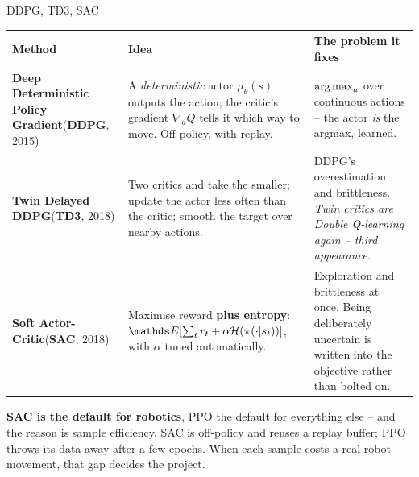 \documentclass[aspectratio=169]{beamer}
\begin{document}
\begin{frame}{DDPG, TD3, SAC}
  \footnotesize
  \begin{center}
  \begin{tabular}{p{2.1cm} p{5.0cm} p{5.4cm}}
    \toprule
    \textbf{Method} & \textbf{Idea} & \textbf{The problem it fixes} \\
    \midrule
    \textbf{Deep Deterministic Policy Gradient}\newline (\textbf{DDPG}, 2015) &
      A \emph{deterministic} actor $\mu_\theta(s)$ outputs the action; the critic's gradient
      $\nabla_a Q$ tells it which way to move. Off-policy, with replay. &
      $\mathop{\mathrm{arg\,max}}_a$ over continuous actions -- the actor \emph{is} the argmax, learned. \\[6pt]
    \textbf{Twin Delayed DDPG}\newline (\textbf{TD3}, 2018) &
      Two critics and take the smaller; update the actor less often than the critic; smooth the
      target over nearby actions. &
      DDPG's overestimation and brittleness. \emph{Twin critics are Double Q-learning again --
      third appearance.} \\[6pt]
    \textbf{Soft Actor-Critic}\newline (\textbf{SAC}, 2018) &
      Maximise reward \textbf{plus entropy}: $\E[\sum_t r_t + \alpha \mathcal{H}(\pi(\cdot|s_t))]$,
      with $\alpha$ tuned automatically. &
      Exploration and brittleness at once. Being deliberately uncertain is written into the
      objective rather than bolted on. \\
    \bottomrule
  \end{tabular}
  \end{center}

  \vskip 6pt
  \begin{tcolorbox}[colback=armblue!8, colframe=armblue, boxrule=0.6pt, arc=2pt]
    \footnotesize
    \textbf{SAC is the default for robotics}, PPO the default for everything else -- and the
    reason is sample efficiency. SAC is off-policy and reuses a replay buffer; PPO throws its
    data away after a few epochs. When each sample costs a real robot movement, that gap decides
    the project.
  \end{tcolorbox}
\end{frame}
\end{document}
